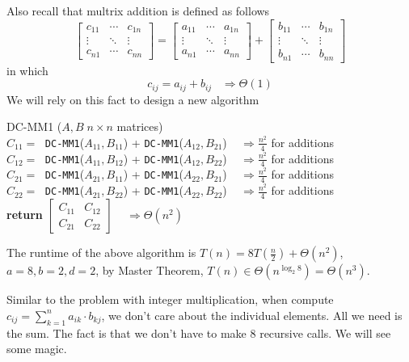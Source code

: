 \documentclass[twoside]{article}
\newcommand{\pc}[1]{\mbox{\textbf{#1}}} %
\begin{document}
Also recall that multrix addition is defined as follows
\begin{equation*}
	\begin{bmatrix}
		c_{11} & \cdots & c_{1n} \\
		\vdots & \ddots & \vdots \\
		c_{n1} & \cdots & c_{nn} 
	\end{bmatrix}
	= 
	\begin{bmatrix}
		a_{11} & \cdots & a_{1n} \\
		\vdots & \ddots & \vdots \\
		a_{n1} & \cdots & a_{nn} 
	\end{bmatrix}
	+ 
	\begin{bmatrix}
		b_{11} & \cdots & b_{1n} \\
		\vdots & \ddots & \vdots \\
		b_{n1} & \cdots & b_{nn} 
	\end{bmatrix}
\end{equation*}
in which $$c_{ij} = a_{ij} + b_{ij} \;\;\;\Rightarrow\Theta(1)$$
We will rely on this fact to design a new algorithm
\begin{algorithme}
	DC-MM1 ($A, B \; n \times n$ matrices)\\
	\> $C_{11} = \;$ \texttt{DC-MM1}($A_{11}, B_{11}$) + \texttt{DC-MM1}($A_{12}, B_{21}$) $\;\;\;\Rightarrow\frac{n^2}{4}$ for additions\\
	\> $C_{12} = \;$ \texttt{DC-MM1}($A_{11}, B_{12}$) + \texttt{DC-MM1}($A_{12}, B_{22}$) $\;\;\;\Rightarrow\frac{n^2}{4}$ for additions\\
	\> $C_{21} = \;$ \texttt{DC-MM1}($A_{21}, B_{11}$) + \texttt{DC-MM1}($A_{22}, B_{21}$) $\;\;\;\Rightarrow\frac{n^2}{4}$ for additions\\
	\> $C_{22} = \;$ \texttt{DC-MM1}($A_{21}, B_{22}$) + \texttt{DC-MM1}($A_{22}, B_{22}$) $\;\;\;\Rightarrow\frac{n^2}{4}$ for additions\\
	\> \pc{return} $\begin{bmatrix}
	C_{11} & C_{12} \\
	C_{21} & C_{22}
	\end{bmatrix}$ $\;\;\;\Rightarrow\Theta(n^2)$\\
\end{algorithme}
The runtime of the above algorithm is $T(n) = 8T(\frac{n}{2}) + \Theta(n^2)$, $a = 8, b =2, d = 2$, by Master Theorem, $T(n) \in \Theta(n^{\log_2 8}) = \Theta(n^3)$. 

Similar to the problem with integer multiplication, when compute $c_{ij} = \sum_{k=1}^{n}a_{ik} \cdot b_{kj}$, we don't care about the individual elements. All we need is the sum. The fact is that we don't have to make 8 recursive calls. We will see some magic. 
\end{document}
